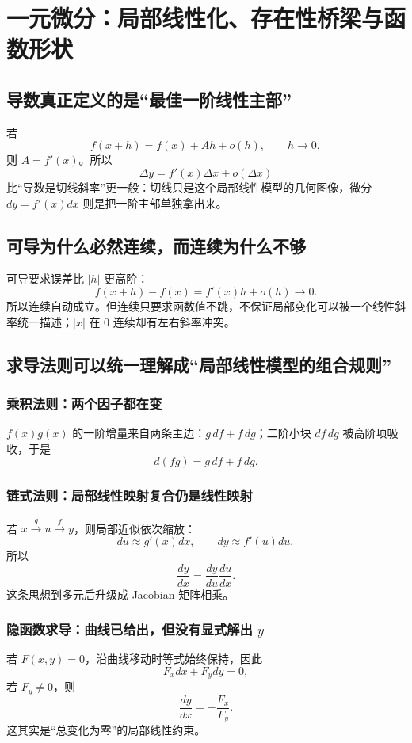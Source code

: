 \documentclass[11pt,a4paper,openany]{ctexbook}
\begin{document}
\chapter{一元微分：局部线性化、存在性桥梁与函数形状}

\section{导数真正定义的是“最佳一阶线性主部”}
若
\[
f(x+h)=f(x)+Ah+o(h),\qquad h\to0,
\]
则 $A=f'(x)$。所以
\[
\boxed{\Delta y=f'(x)\Delta x+o(\Delta x)}
\]
比“导数是切线斜率”更一般：切线只是这个局部线性模型的几何图像，微分 $dy=f'(x)dx$ 则是把一阶主部单独拿出来。

\section{可导为什么必然连续，而连续为什么不够}
可导要求误差比 $|h|$ 更高阶：
\[
f(x+h)-f(x)=f'(x)h+o(h)\to0.
\]
所以连续自动成立。但连续只要求函数值不跳，不保证局部变化可以被一个线性斜率统一描述；$|x|$ 在 0 连续却有左右斜率冲突。

\section{求导法则可以统一理解成“局部线性模型的组合规则”}
\subsection{乘积法则：两个因子都在变}
$f(x)g(x)$ 的一阶增量来自两条主边：$g\,df+f\,dg$；二阶小块 $df\,dg$ 被高阶项吸收，于是
\[
d(fg)=g\,df+f\,dg.
\]

\subsection{链式法则：局部线性映射复合仍是线性映射}
若 $x\xrightarrow{g}u\xrightarrow{f}y$，则局部近似依次缩放：
\[
du\approx g'(x)dx,\qquad dy\approx f'(u)du,
\]
所以
\[
\boxed{\frac{dy}{dx}=\frac{dy}{du}\frac{du}{dx}}.
\]
这条思想到多元后升级成 Jacobian 矩阵相乘。

\subsection{隐函数求导：曲线已给出，但没有显式解出 $y$}
若 $F(x,y)=0$，沿曲线移动时等式始终保持，因此
\[
F_xdx+F_y dy=0,
\]
若 $F_y\neq0$，则
\[
\frac{dy}{dx}=-\frac{F_x}{F_y}.
\]
这其实是“总变化为零”的局部线性约束。
\end{document}
